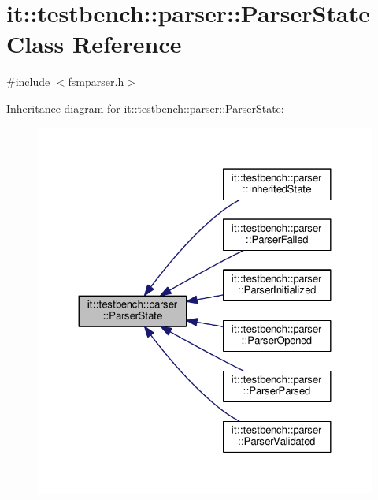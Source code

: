 \hypertarget{classit_1_1testbench_1_1parser_1_1ParserState}{\section{it\-:\-:testbench\-:\-:parser\-:\-:Parser\-State Class Reference}
\label{db/d52/classit_1_1testbench_1_1parser_1_1ParserState}
}


{\ttfamily \#include $<$fsmparser.\-h$>$}



Inheritance diagram for it\-:\-:testbench\-:\-:parser\-:\-:Parser\-State\-:
\nopagebreak
\begin{figure}[H]
\begin{center}
\leavevmode
\includegraphics[width=324pt]{d1/dd8/classit_1_1testbench_1_1parser_1_1ParserState__inherit__graph}
\end{center}
\end{figure}
